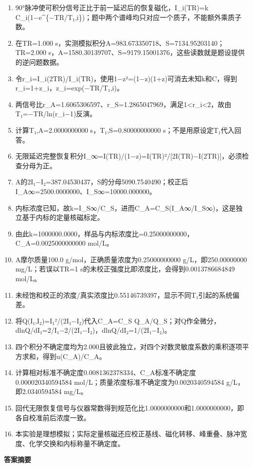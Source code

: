 \documentclass[UTF8,11pt,a4paper]{ctexart}
\begin{document}
\begin{enumerate}
\item 90°脉冲使可积分信号正比于前一延迟后的恢复磁化，I\_i(TR)=k C\_i(1−e\textasciicircum{}\{−TR/T₁,i\})；题中两个谱峰均只对应一个质子，不能额外乘质子数。
\item 在TR=1.000 s，实测模拟积分A=983.673350718、S=7134.95203140；TR=2.000 s，A=1580.30139707、S=9179.15001376，这些读数就是题设提供的逆问题数据。
\item 令r\_i=I\_i(2TR)/I\_i(TR)，使用1−z²=(1−z)(1+z)可消去未知k和C，得到r\_i=1+z\_i，z\_i=exp(−TR/T₁,i)。
\item 两信号比r\_A=1.6065306597、r\_S=1.2865047969，满足1<r\_i<2，故由T₁=−TR/ln(r\_i−1)反演。
\item 计算T₁,A=2.0000000000 s，T₁,S=0.80000000000 s；不是用原设定T₁代入回答。
\item 无限延迟完整恢复积分I\_∞=I(TR)/(1−z)=I(TR)²/[2I(TR)−I(2TR)]，必须检查分母为正。
\item A的2I₁−I₂=387.04530437，S的分母5090.7540490；校正后I\_A∞=2500.0000000、I\_S∞=10000.000000。
\item 内标浓度已知，故k=I\_S∞/C\_S，进而C\_A=C\_S(I\_A∞/I\_S∞)，这是独立基于内标的定量核磁标定。
\item 由此k=1000000.0000，样品与内标浓度比=0.25000000000，C\_A=0.0025000000000 mol/L。
\item A摩尔质量100.0 g/mol，正确质量浓度为0.25000000000 g/L，即250.00000000 mg/L；若误以TR=1 s的未校正强度比即浓度比，会得到0.0013786684849 mol/L。
\item 未经饱和校正的浓度/真实浓度比0.55146739397，显示不同T₁引起的系统偏差。
\item 将Q(I₁,I₂)=I₁²/(2I₁−I₂)代入C\_A=C\_S Q\_A/Q\_S；对Q作全微分，dlnQ/dI₁=2/I₁−2/(2I₁−I₂)，dlnQ/dI₂=1/(2I₁−I₂)。
\item 四个积分不确定度均为2.000且彼此独立，对四个对数灵敏度系数的乘积逐项平方求和，得到u(C\_A)/C\_A。
\item 计算相对标准不确定度0.0081362378334、C\_A标准不确定度0.000020340594584 mol/L；质量浓度标准不确定度为0.0020340594584 g/L，即2.0340594584 mg/L。
\item 回代无限恢复信号与仪器常数得到规范化比1.0000000000和1.0000000000，即各自校准前后浓度一致。
\item 本实验是理想模拟；实际定量核磁还应校正基线、磁化转移、峰重叠、脉冲宽度、化学交换和内标称量不确定度。
\end{enumerate}
\noindent\textbf{答案摘要}\par
\end{document}
